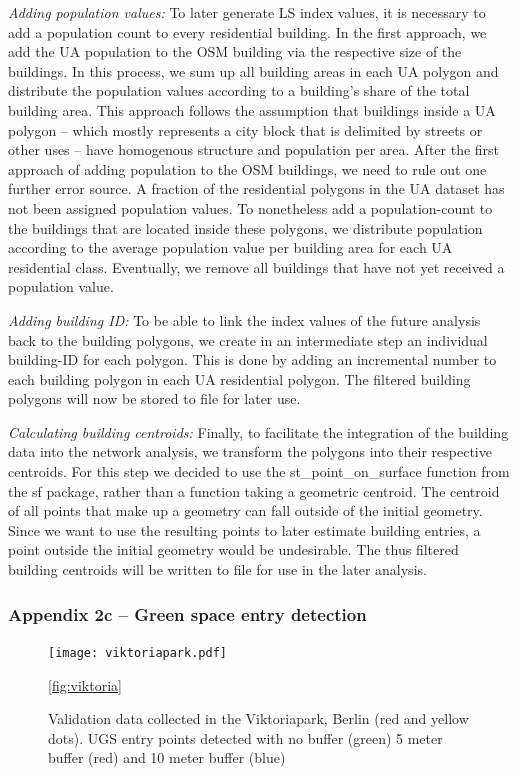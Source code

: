 \documentclass[10pt]{article}
\begin{document}
\textit{Adding population values:} To later generate LS index values, it is necessary to add a population count to every residential building. In the first approach, we add the UA population to the OSM building via the respective size of the buildings. In this process, we sum up all building areas in each UA polygon and distribute the population values according to a building’s share of the total building area. This approach follows the assumption that buildings inside a UA polygon – which mostly represents a city block that is delimited by streets or other uses – have homogenous structure and population per area. After the first approach of adding population to the OSM buildings, we need to rule out one further error source. A fraction of the residential polygons in the UA dataset has not been assigned population values. To nonetheless add a population-count to the buildings that are located inside these polygons, we distribute population according to the average population value per building area for each UA residential class. Eventually, we remove all buildings that have not yet received a population value.  

\textit{Adding building ID:} To be able to link the index values of the future analysis back to the building polygons, we create in an intermediate step an individual building-ID for each polygon. This is done by adding an incremental number to each building polygon in each UA residential polygon. The filtered building polygons will now be stored to file for later use. 
 
\textit{Calculating building centroids:} Finally, to facilitate the integration of the building data into the network analysis, we transform the polygons into their respective centroids. For this step we decided to use the st\_point\_on\_surface function from the sf package, rather than a function taking a geometric centroid. The centroid of all points that make up a geometry can fall outside of the initial geometry. Since we want to use the resulting points to later estimate building entries, a point outside the initial geometry would be undesirable. The thus filtered building centroids will be written to file for use in the later analysis.

\subsubsection{Appendix 2c – Green space entry detection}
\begin{figure}
\centering
\texttt{[image: viktoriapark.pdf]}
\caption{Validation data collected in the Viktoriapark, Berlin (red and yellow dots). UGS entry points detected with no buffer (green) 5 meter buffer (red) and 10 meter buffer (blue)}
\ref{fig:viktoria}
\end{figure}
\end{document}
